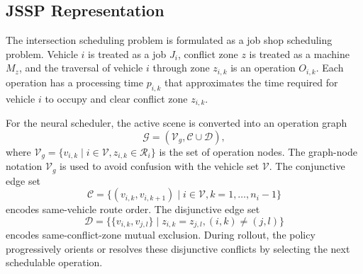 \begin{figure}[!t]
\centering
{}
\caption{}
\label{fig:intersection_tuple_graph}
\end{figure}

\subsection{JSSP Representation}
The intersection scheduling problem is formulated as a job shop scheduling problem. Vehicle $i$ is treated as a job $J_i$, conflict zone $z$ is treated as a machine $M_z$, and the traversal of vehicle $i$ through zone $z_{i,k}$ is an operation $O_{i,k}$. Each operation has a processing time $p_{i,k}$ that approximates the time required for vehicle $i$ to occupy and clear conflict zone $z_{i,k}$.

\begin{addedtwoblock}
For the neural scheduler, the active scene is converted into an operation graph
\begin{equation}
  \mathcal{G}=\left(\mathcal{V}_g,\mathcal{C}\cup\mathcal{D}\right),
  \label{eq:operation_graph}
\end{equation}
where $\mathcal{V}_g=\{v_{i,k}\mid i\in\mathcal{V}, z_{i,k}\in\mathcal{R}_i\}$ is the set of operation nodes. The graph-node notation $\mathcal{V}_g$ is used to avoid confusion with the vehicle set $\mathcal{V}$. The conjunctive edge set
\begin{equation}
  \mathcal{C}=\{(v_{i,k},v_{i,k+1})\mid i\in\mathcal{V}, k=1,\ldots,n_i-1\}
\end{equation}
encodes same-vehicle route order. The disjunctive edge set
\begin{equation}
  \mathcal{D}=\{\{v_{i,k},v_{j,l}\}\mid z_{i,k}=z_{j,l}, (i,k)\neq(j,l)\}
\end{equation}
encodes same-conflict-zone mutual exclusion. During rollout, the policy progressively orients or resolves these disjunctive conflicts by selecting the next schedulable operation.
\end{addedtwoblock}

